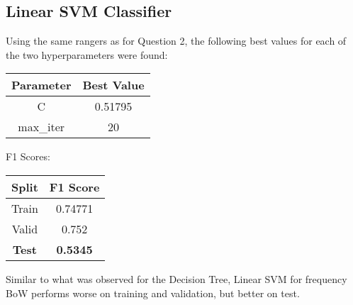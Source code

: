 \documentclass{article}
\begin{document}
\subsection{Linear SVM Classifier}
Using the same rangers as for Question 2, the following best values for each of the two hyperparameters were found:
\begin{center}
\begin{tabular}{ |c|c| } 
	\hline
	\textbf{Parameter} & \textbf{Best Value} \\ 
	\hline
	C & 0.51795 \\
	max\_iter & 20 \\ 
	\hline
\end{tabular}
\end{center}

F1 Scores:
\begin{center}
\begin{tabular}{ |c|c| } 
	\hline
	\textbf{Split} & \textbf{F1 Score} \\ 
	\hline
	Train & 0.74771 \\
	Valid & 0.752 \\ 
	\textbf{Test} & \textbf{0.5345} \\
	\hline
\end{tabular}
\end{center}

Similar to what was observed for the Decision Tree, Linear SVM for frequency BoW performs worse on training and validation, but better on test.
\end{document}
